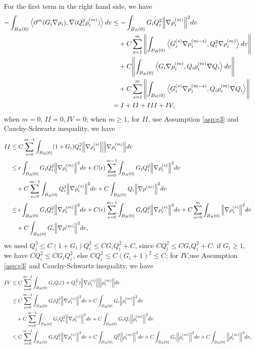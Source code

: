 \documentclass[a4paper, 11pt]{article}
\newcommand{\inner}[2]{\left< #1 , #2 \right>}
\theoremstyle{plain}
\theoremstyle{remark}
\theoremstyle{definition}
\newcommand{\intr}{\int_{B_R(0)}}
\newcommand{\Q}{Q}
\begin{document}
For the first term in the right hand side, we have
\begin{equation}
	\begin{aligned}
	-\intr\inner{\partial^m(G_i\nabla\rho_i)}{\nabla(\Q_i^2\rho_i^{(m)})}dv&\leq -\intr G_i\Q_i^2\norm{\nabla\rho_i^{(m)}}^2dv\\
	&\quad +C\sum_{s=1}^m\norm{\intr\inner{G_i^{(s)}\nabla\rho_i^{(m-s)}}{\Q_i^2\nabla\rho_i^{(m)}}dv}\\
	&\quad +C\norm{\intr\inner{G_i\nabla\rho_i^{(m)}}{\Q_i\rho_i^{(m)}\nabla \Q_i}dv}\\
	&\quad+C\sum_{s=1}^m\norm{\intr\inner{G_i^{(s)}\nabla\rho_i^{(m-s)}}{\Q_i\rho_i^{(m)}\nabla\Q_i}}\\
	&=I+II+III+IV,
	\end{aligned}
\end{equation}	
when $m=0$, $II=0,IV=0$;  when $m\geq 1$,  for $II$, use Assumption \ref{asp:g3} and Cauchy-Schwartz inequality, we have 
	\begin{equation}
		\begin{aligned}
			II&\leq C\sum_{i=0}^{m-1}\intr (1+G_i)Q_i^2\norm{\nabla\rho_i^{(s)}}\norm{\nabla\rho_i^{(m)}}dv\\
            &\leq\epsilon\intr G_i\Q_i^2\norm{\nabla\rho_i^{(m)}}^2dv+C(\epsilon)\sum_{s=0}^{m-1}\intr G_i\Q_i^2\norm{\nabla\rho_i^{(s)}}^2dv\\
            &\quad+C\sum_{s=0}^{m-1}\intr Q_i^3\norm{\nabla \rho_i^{(s)}}^2dv+C\intr Q_i\norm{\nabla\rho^{(m)}}^2dv\\
            &\leq \epsilon\intr G_i\Q_i^2\norm{\nabla\rho_i^{(m)}}^2dv+C(\epsilon)\sum_{s=0}^{m-1}\intr G_i\Q_i^2\norm{\nabla\rho_i^{(s)}}^2dv+C\sum_{s=0}^m\intr \norm{\nabla \rho_i^{(s)}}^2dv\\
            &\quad+C\intr G_i\norm{\nabla\rho^{(m)}}^2dv,
		\end{aligned}
	\end{equation}
    we used $Q_i^3\leq C(1+G_i)Q_i^2\leq CG_iQ_i^2+C$, since $CQ_i^2\leq CG_iQ_i^2+C$: if $G_i\geq 1$, we have $CQ_i^2\leq CG_iQ_i^2$, else $CQ_i^2\leq C(G_i+1)^2\leq C$; for $IV$,use Assumption \ref{asp:g3} and Cauchy-Schwartz inequality, we have
	\begin{equation}
		\begin{aligned}
			IV&\leq C\sum_{s=0}^{m-1}\intr G_iQ_i(1+Q_i^{\frac{1}{2}})\norm{\nabla \rho_i^{(s)}}\norm{\rho_i^{(m)}}dv\\
            &\leq C\sum_{s=0}^{m-1}\intr G_iQ_i^2\norm{\nabla\rho_i^{(s)}}^2dv+C\intr G_i\norm{\rho_i^{(m)}}^2dv \\
            &\quad+C\sum_{s=0}^{m-1}\intr G_iQ_i^2\norm{\nabla\rho_i^{(s)}}^2dv+C\intr G_iQ_i\norm{\rho_i^{(m)}}^2dv\\
            &\leq C\sum_{s=0}^{m-1}\intr G_iQ_i^2\norm{\nabla\rho_i^{(s)}}^2dv+C\intr Q_i^2\norm{\rho_i^{(m)}}^2dv+C\intr G_i\norm{\rho_i^{(m)}}^2dv+C\intr \norm{\rho_i^{(m)}}^2dv,
		\end{aligned}
	\end{equation}
\end{document}
